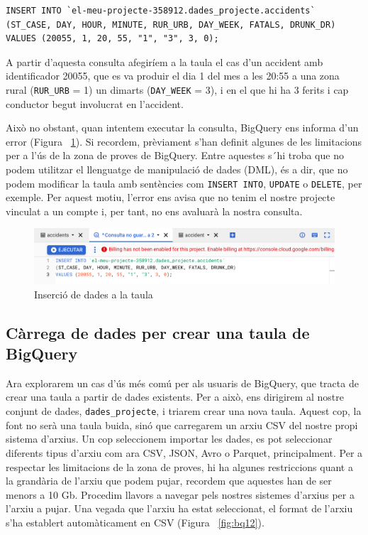 \documentclass[11pt,longbibliography]{article}
\theoremstyle{definition}
\theoremstyle{remark}
\begin{document}
\begin{verbatim}
INSERT INTO `el-meu-projecte-358912.dades_projecte.accidents` 
(ST_CASE, DAY, HOUR, MINUTE, RUR_URB, DAY_WEEK, FATALS, DRUNK_DR)
VALUES (20055, 1, 20, 55, "1", "3", 3, 0);
\end{verbatim}

A partir d'aquesta consulta afegiríem a la taula el cas d'un accident amb identificador 20055, que es va produir el dia 1 del mes a les 20:55 a una zona rural (\verb|RUR_URB| = 1) un dimarts (\verb|DAY_WEEK| = 3), i en el que hi ha 3 ferits i cap conductor begut involucrat en l'accident.

Això no obstant, quan intentem executar la consulta, BigQuery ens informa d'un error (Figura ~\ref{fig:bq11}). Si recordem, prèviament s'han definit algunes de les limitacions per a l'ús de la zona de proves de BigQuery. Entre aquestes s´hi troba que no podem utilitzar el llenguatge de manipulació de dades (DML), és a dir, que no podem modificar la taula amb sentències com \verb|INSERT INTO|, \verb|UPDATE| o \verb|DELETE|, per exemple. Per aquest motiu, l'error ens avisa que no tenim el nostre projecte vinculat a un compte i, per tant, no ens avaluarà la nostra consulta.


\begin{figure}[h!]
\begin{center}
\includegraphics[width=12cm]{bq11}
\end{center}
\caption{Inserció de dades a la taula}
\label{fig:bq11}
\end{figure}


\newpage

\subsection{Càrrega de dades per crear una taula de BigQuery}

Ara explorarem un cas d'ús més comú per als usuaris de BigQuery, que tracta de crear una taula a partir de dades existents. Per a això, ens dirigirem al nostre conjunt de dades, \verb|dades_projecte|, i triarem crear una nova taula. Aquest cop, la font no serà una taula buida, sinó que carregarem un arxiu CSV del nostre propi sistema d'arxius. Un cop seleccionem importar les dades, es pot seleccionar diferents tipus d'arxiu com ara CSV, JSON, Avro o Parquet, principalment. Per a respectar les limitacions de la zona de proves, hi ha algunes restriccions quant a la grandària de l'arxiu que podem pujar, recordem que aquestes han de ser menors a 10 Gb. Procedim llavors a navegar pels nostres sistemes d'arxius per a l'arxiu a pujar. Una vegada que l'arxiu ha estat seleccionat, el format de l'arxiu s'ha establert automàticament en CSV (Figura ~\ref{fig:bq12}). 
\end{document}
